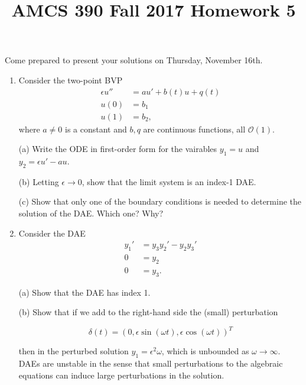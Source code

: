 \documentclass[12pt]{article}
\title{AMCS 390 Fall 2017 Homework 5}
\begin{document}
\date{}
\maketitle

Come prepared to present your solutions on Thursday, November 16th.

\begin{enumerate}

    \item Consider the two-point BVP
        \begin{align*}
            \epsilon u'' & = a u' + b(t)u + q(t) \\
            u(0) & = b_1 \\
            u(1) & = b_2,
        \end{align*}
        where $a\ne0$ is a constant and $b, q$ are continuous functions, all
        ${\mathcal O}(1)$.

        (a) Write the ODE in first-order form for the vairables $y_1=u$ and
            $y_2 = \epsilon u' - au$.
        
        (b) Letting $\epsilon \to 0$, show that the limit system is an index-1 DAE.

        (c) Show that only one of the boundary conditions is needed to
            determine the solution of the DAE.  Which one?  Why?

    \item Consider the DAE
        \begin{align*}
            y_1' & = y_3 y_2' - y_2 y_3' \\
            0 & = y_2 \\
            0 & = y_3.
        \end{align*}
    
        (a) Show that the DAE has index 1.

        (b) Show that if we add to the right-hand side the (small) perturbation

                $$\delta(t) = (0, \epsilon\sin(\omega t), \epsilon\cos(\omega t))^T$$

            then in the perturbed solution $y_1 = \epsilon^2 \omega$, which is unbounded
            as $\omega \to \infty$.  DAEs are unstable in the sense that small perturbations
            to the algebraic equations can induce large perturbations in the solution.
\end{enumerate}
\end{document}
